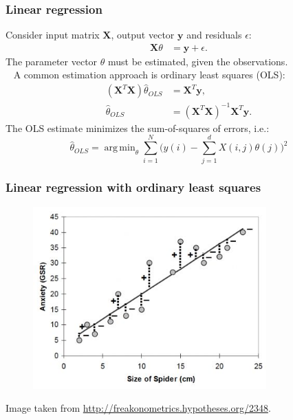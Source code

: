 \documentclass{beamer}
\DeclareMathOperator*{\argmin}{arg\,min}
\begin{document}
\begin{frame}
\frametitle{Linear regression}
Consider input matrix $\mathbf{X}$, output vector $\mathbf{y}$ and residuals $\epsilon$:
\begin{align*}
\mathbf{X}\theta &= \mathbf{y} + \epsilon.
\end{align*}
The parameter vector $\theta$ must be estimated, given the observations.\\
\pause
\ \newline
A common estimation approach is ordinary least squares (OLS):
\begin{align*}
(\mathbf{X}^T\mathbf{X})\hat{\theta}_{OLS} &= \mathbf{X}^T\mathbf{y}, \\
\hat{\theta}_{OLS} &= (\mathbf{X}^T\mathbf{X})^{-1} \mathbf{X}^T\mathbf{y}.
\end{align*}
\pause
The OLS estimate minimizes the sum-of-squares of errors, i.e.:
\begin{equation*}
\hat{\theta}_{OLS} = \argmin_{\theta} \sum_{i=1}^N \big(y(i) - \sum_{j=1}^d X(i,j)\theta(j)\big)^2
\end{equation*}
\end{frame}

\begin{frame}
\frametitle{Linear regression with ordinary least squares}
\begin{figure}[!h]
  \centering
  \includegraphics[width=0.8\textwidth]{linear-regression.jpg}
\end{figure}
\tiny{Image taken from \url{http://freakonometrics.hypotheses.org/2348}}.
\end{frame}
\end{document}

